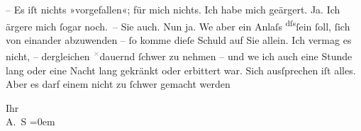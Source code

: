 \pstart
           – Es iſt nichts »vorgefallen«; für mich nichts. Ich habe mich geärgert.
               Ja. Ich ärgere mich ſogar noch. – Sie auch. Nun ja. We{\geminationn}
               aber ein Anlaſs \substVorne{}\textsuperscript{dſs}\substDazwischen{}ſein ſoll\substHinten{}, ſich von einander abzu{\pb}wenden – ſo
               komme dieſe Schuld auf Sie allein. Ich vermag es nicht, – dergleichen \substVorne{}\textsuperscript{\textcolor{gray}{×}}\substDazwischen{}dauernd\substHinten{} ſchwer zu nehmen – und we{\geminationn} ich auch \strikeout{\textcolor{gray}{×}\-\textcolor{gray}{×}\-\textcolor{gray}{×}\-\textcolor{gray}{×}\-\textcolor{gray}{×}\-\textcolor{gray}{×}\-\textcolor{gray}{×}\-\textcolor{gray}{×}\-\textcolor{gray}{×}}{ }\strikeout{\textcolor{gray}{und}} eine Stunde lang oder eine Nacht lang gekränkt oder erbittert war. Sich
               ausſprechen iſt alles. Aber es darf einem nicht {\pb}zu ſchwer gemacht werden\pend
           
\pstart
           Ihr {\\[\baselineskip]}\spacefill\mbox{A. S}\pend
           \leftskip=0em{}\endnumbering{}  
      